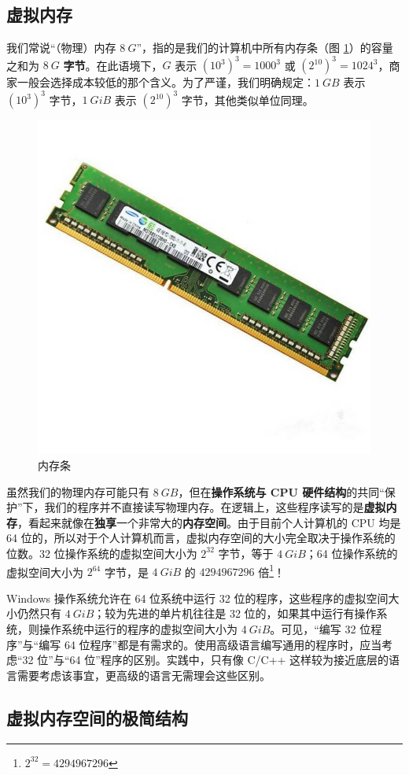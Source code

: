 \subsection{虚拟内存}

我们常说“（物理）内存 $\SI{8}{G}$”，指的是我们的计算机中所有内存条（图 \ref{pic:ddr}）的容量之和为 $\SI{8}{G}$ \textbf{字节}。在此语境下，$\si{G}$ 表示 $(10^3)^3 = 1000^3$ 或 $(2^{10})^3 = 1024^3$，商家一般会选择成本较低的那个含义。为了严谨，我们明确规定：$\SI{1}{GB}$ 表示 $(10^3)^3$ 字节，$\SI{1}{GiB}$ 表示 $(2^{10})^3$ 字节，其他类似单位同理。

\begin{figure}[ht]
	\centering
	\includegraphics[width=0.5\linewidth]{pic/ddr.png}
	\caption{内存条}
	\label{pic:ddr}
\end{figure}

虽然我们的物理内存可能只有 $\SI{8}{GB}$，但在\textbf{操作系统与 CPU 硬件结构}的共同“保护”下，我们的程序并不直接读写物理内存。在逻辑上，这些程序读写的是\textbf{虚拟内存}，看起来就像在\textbf{独享}一个非常大的\textbf{内存空间}。由于目前个人计算机的 CPU 均是 64 位的，所以对于个人计算机而言，虚拟内存空间的大小完全取决于操作系统的位数。32 位操作系统的虚拟空间大小为 $2^{32}$ 字节，等于 $\SI{4}{GiB}$；64 位操作系统的虚拟空间大小为 $2^{64}$ 字节，是 $\SI{4}{GiB}$ 的 $4294967296$ 倍\footnote{$2^{32} = 4294967296$}！

Windows 操作系统允许在 64 位系统中运行 32 位的程序，这些程序的虚拟空间大小仍然只有 $\SI{4}{GiB}$；较为先进的单片机往往是 32 位的，如果其中运行有操作系统，则操作系统中运行的程序的虚拟空间大小为 $\SI{4}{GiB}$。可见，“编写 32 位程序”与“编写 64 位程序”都是有需求的。使用高级语言编写通用的程序时，应当考虑“32 位”与“64 位”程序的区别。实践中，只有像 C/C++ 这样较为接近底层的语言需要考虑该事宜，更高级的语言无需理会这些区别。

\subsection{虚拟内存空间的极简结构}

